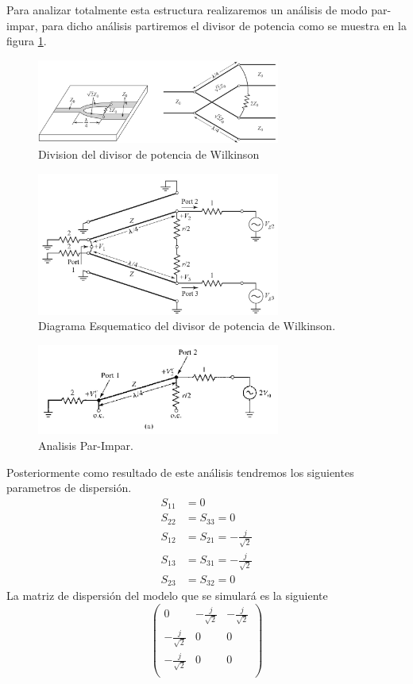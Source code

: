 \documentclass[a4paper]{IEEEtran} %
\begin{document}
Para analizar totalmente esta estructura realizaremos un análisis de modo par-impar, para dicho análisis partiremos el divisor de potencia como se muestra en la figura \ref{fig:Analisis}.
\vspace{50mm}
\begin{figure}[h]
    \centering
        \includegraphics[width=8cm]{imagenes/img17}
        \caption{Division del divisor de potencia de Wilkinson}
        \label{fig:Analisis}
\end{figure}
\begin{figure}[h]
    \centering
    \includegraphics[width=8cm]{imagenes/img3}
    \caption{Diagrama Esquematico del divisor de potencia de Wilkinson.}
    \label{fig:diagrama}
\end{figure}
\begin{figure}[h]    
    \centering
        \includegraphics[width=8cm]{imagenes/img4}
        \caption{Analisis Par-Impar.}
        \label{fig:analisis-par-impar}
\end{figure}
Posteriormente como resultado de este análisis tendremos los siguientes parametros de dispersión. 
\begin{equation}
\begin{split}
    S_{11}&=0 \\
    S_{22}&=S_{33}=0 \\
    S_{12}&=S_{21}=-\frac{j}{\sqrt{2}}\\
    S_{13}&=S_{31}=-\frac{j}{\sqrt{2}}\\
    S_{23}&=S_{32}=0
\end{split}
    \label{eq:parametros}
\end{equation}
La matriz de dispersión del modelo que se simulará es la siguiente
\begin{equation}
    \begin{pmatrix}
    0&-\frac{j}{\sqrt{2}}&-\frac{j}{\sqrt{2}}\\
    -\frac{j}{\sqrt{2}}&0&0\\
    -\frac{j}{\sqrt{2}}&0&0\\
    \end{pmatrix}
    \label{eq:matrix_numbers}
\end{equation}
\end{document}

